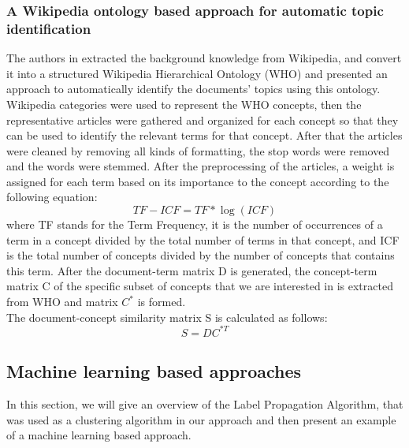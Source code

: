 \subsubsection{A Wikipedia ontology based approach for automatic topic identification}
The authors in \cite{a:ont2} extracted the background knowledge from Wikipedia, and convert it into a structured Wikipedia Hierarchical Ontology (WHO) and presented an approach to automatically identify the documents' topics using this ontology.\\
Wikipedia categories were used to represent the WHO concepts, then the representative articles were gathered and organized for each concept so that they can be used to identify the relevant terms for that concept. After that the articles were cleaned by removing all kinds of formatting, the stop words were removed and the words were stemmed. After the preprocessing of the articles, a weight is assigned for each term
based on its importance to the concept according to the following equation:
\begin{equation}
TF-ICF = TF * \log(ICF)
\end{equation}
where TF stands for the Term Frequency, it is the number of occurrences of a term in a concept divided by the total number of terms in that concept, and ICF is the total number of concepts divided by the number of concepts that contains this term.  After the document-term matrix D is generated, the concept-term matrix C of the specific subset of concepts that we are interested in is extracted from WHO and matrix $C^{*}$ is formed.\\
The document-concept similarity matrix S is calculated as follows:\\
\begin{equation}
S = DC^{*T}
\end{equation}
\subsection{Machine learning based approaches}
In this section, we will give an overview of the Label Propagation Algorithm, that was used as a clustering algorithm in our approach and then present an example of a machine learning based approach.
	
